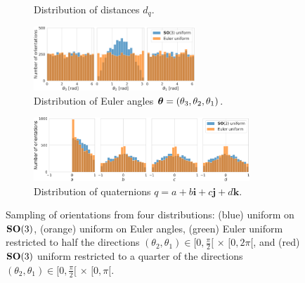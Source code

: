 \begin{figure}[ht!]
\begin{minipage}{.65\linewidth}
\begin{subfigure}[b]{0.37\linewidth}
            \caption{Distribution of distances $d_q$.}%
            \label{fig:orientation-sampling:distances}
            \vspace{0.2cm}
        \end{subfigure}
        \hfill
        \begin{subfigure}[b]{0.6\linewidth}
            \centering
            \includegraphics[height=2.4cm]{figures/uniform_quaternions_vs_angles_ang.pdf}
            \caption{Distribution of Euler angles ${\boldsymbol{\theta}} = (\theta_3,\theta_2,\theta_1)$.}%
            \label{fig:orientation-sampling:angles}
            \vspace{0.2cm}
        \end{subfigure}
        \begin{subfigure}[b]{0.97\linewidth}
            \centering
            \includegraphics[height=2.4cm]{figures/uniform_quaternions_vs_angles_q.pdf}
            \caption{Distribution of quaternions $q = a + b\boldsymbol{i} + c\boldsymbol{j} + d\boldsymbol{k}$.}%
            \label{fig:orientation-sampling:quaternions}
        \end{subfigure}
    \end{minipage}
    \caption{%
        Sampling of orientations from four distributions:
        (blue) uniform on $\mathrm{\mathbf{SO}}(3)$, (orange) uniform on Euler angles, (green) Euler uniform restricted to half the directions $(\theta_2, \theta_1) \in [0,\frac{\pi}{2}[ \, \times \, [0,2\pi[$, and (red) $\mathrm{\mathbf{SO}}(3)$ uniform restricted to a quarter of the directions $(\theta_2, \theta_1) \in [0,\frac{\pi}{2}[ \, \times \, [0,\pi[$.
    }\label{fig:orientation-sampling}
\end{figure}

